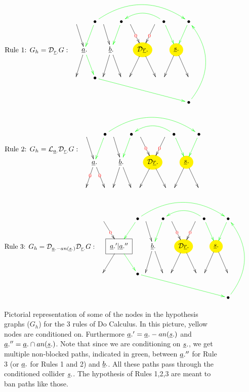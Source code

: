 \begin{figure}[h!]

$\text{Rule 1: }G_h=\cald_{\rvr.}G: 
\begin{array}{ccccc}
\xymatrix@C=.2pc{
\\
&&\bullet\ar@/^2pc/@[green][rrrrrrrrr]&&&\bullet&&&&\bullet\ar@/_1pc/@[green][llll]&&\bullet&&&&
\\
&\rva.\ar@{<-}[ul]\ar@{<-}@[green][ur]\ar[dl]\ar@[green][dr]
&&&\rvb.\ar@{<-}[ul]\ar@{<-}@[green][ur]\ar[dl]\ar[dr]
&&&*++[o][F*:yellow]{\cald\rvr.}\ar@{<-}[ul]|{\color{red}0}\ar@{<-}[ur]|{\color{red}0}\ar[dl]\ar[dr]
&&&*++[o][F*:yellow]{\rvs.}\ar@{<-}@[green][ul]\ar@{<-}@[green][ur]\ar[dl]\ar[dr]
\\
&&\bullet\ar@[green][drrrrrrrrr]&&&&&&&&&&&&&
\\
&&&&&&&&&&&\bullet\ar@[green]@/_2pc/[uuu]&&&&
}
\end{array}
$
$\text{Rule 2: }G_h=\call_{\rva.}\cald_{\rvr.}G: 
\begin{array}{ccccc}
\xymatrix@C=.2pc{
\\
&&\bullet\ar@/^2pc/@[green][rrrrrrrrr]&&&\bullet&&&&\bullet\ar@/_1pc/@[green][llll]&&\bullet&&&&
\\
&\rva.\ar@{<-}[ul]\ar@{<-}@[green][ur]\ar|{\color{red}0}[dl]\ar|{\color{red}0}[dr]
&&&\rvb.\ar@{<-}[ul]\ar@{<-}@[green][ur]\ar[dl]\ar[dr]
&&&*++[o][F*:yellow]{\cald\rvr.}\ar@{<-}[ul]|{\color{red}0}\ar@{<-}[ur]|{\color{red}0}\ar[dl]\ar[dr]
&&&*++[o][F*:yellow]{\rvs.}\ar@{<-}@[green][ul]\ar@{<-}@[green][ur]\ar[dl]\ar[dr]
\\
&&&&&&&&&&&&&&&
}
\end{array}
$
$\text{Rule 3: }G_h=\cald_{\rva.-an(\rvs.)}\cald_{\rvr.}G:
\begin{array}{ccccc}
\xymatrix@C=.2pc{
\\
&&\bullet\ar@/^2pc/@[green][rrrrrrrrr]&&&\bullet&&&&\bullet\ar@/_1pc/@[green][llll]&&\bullet&&&&
\\
&\Rect{\rva.'|\rva.''}\ar@{<-}[ul]|{\color{red}0}\ar@{<-}@[green][ur]\ar[dl]\ar@[green][dr]
&&&\rvb.\ar@{<-}[ul]\ar@{<-}@[green][ur]\ar[dl]\ar[dr]
&&&*++[o][F*:yellow]{\cald\rvr.}\ar@{<-}[ul]|{\color{red}0}\ar@{<-}[ur]|{\color{red}0}\ar[dl]\ar[dr]
&&&*++[o][F*:yellow]{\rvs.}\ar@{<-}@[green][ul]\ar@{<-}@[green][ur]\ar[dl]\ar[dr]
\\
&&\bullet\ar@[green][drrrrrrrrr]&&&&&&&&&&&&&
\\
&&&&&&&&&&&\bullet\ar@[green]@/_2pc/[uuu]&&&&
}
\end{array}
$
\caption{Pictorial representation of some of the nodes in the
hypothesis graphs ($G_h$) for the 3
 rules of Do Calculus. In this picture,
 yellow nodes are conditioned on.
 Furthermore $\rva.'=\rva.-an(\rvs.)$
 and $\rva.'' =\rva.\cap an(\rvs.)$.
 Note that 
 since we are conditioning on $\rvs.$,
 we get multiple non-blocked paths,
 indicated in green, between $\rva.''$ for Rule 3 (or 
 $\rva.$ for Rules 1 and 2)
 and $\rvb.$.
 All these paths
 pass through the conditioned collider $\rvs.$. The hypothesis
 of Rules 1,2,3 are meant to
 ban paths like those.
}
\label{fig-do-rules}
\end{figure}




